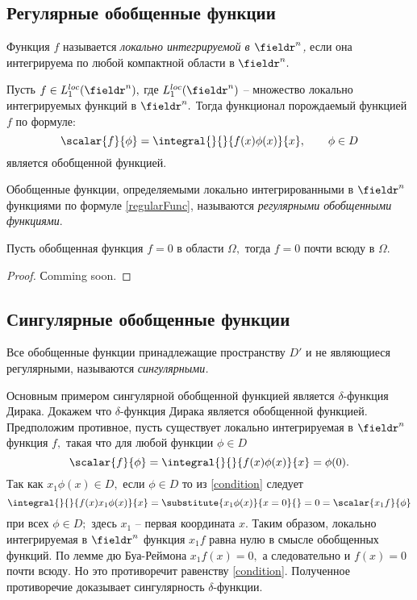 \subsection{Регулярные обобщенные функции}
Функция $f$ называется \emph{локально интегрируемой в $\fieldr^n$,} если она интегрируема по любой компактной области в $\fieldr^n.$

Пусть $f \in L_1^{loc}(\fieldr^n),$ где $L_1^{loc}(\fieldr^n)$ -- множество локально интегрируемых функций в $\fieldr^n.$ Тогда функционал порождаемый функцией $f$ по формуле:
\begin{equation}
\scalar{f}{\phi} = \integral{}{}{f(x)\phi(x)}{x}, \qquad \phi \in D
\label{regularFunc}
\end{equation}
является обобщенной функцией.
 
Обобщенные функции, определяемыми локально интегрированными в $\fieldr^n$ функциями по формуле \eqref{regularFunc}, называются \emph{регулярными обобщенными функциями}.
\begin{lemma}
 Пусть обобщенная функция $f = 0$ в области $\Omega,$ тогда $f = 0$ почти всюду в $\Omega.$ 
\end{lemma}
\begin{proof}
   Сomming soon.
\end{proof}

\subsection{Сингулярные обобщенные функции}
Все обобщенные функции принадлежащие пространству $D'$ и не являющиеся регулярными, называются \emph{сингулярными.}

Основным примером сингулярной обобщенной функцией является $\delta$-функция Дирака.
Докажем что $\delta$-функция Дирака является обобщенной функцией.
Предположим противное, пусть существует локально интегрируемая в $\fieldr^n$ функция $f,$ такая что для любой функции $\phi \in D$
\begin{equation}
\scalar{f}{\phi} = \integral{}{}{f(x)\phi(x)}{x} = \phi(0).
\label{condition}
\end{equation}
Так как $x_1\phi(x) \in D,$ если $\phi \in D$ то из \eqref{condition} следует
$$
\integral{}{}{f(x)x_1\phi(x)}{x} = \substitute{x_1\phi(x)}{x = 0}{} = 0 = \scalar{x_1f}{\phi}
$$
при всех $\phi \in D;$ здесь $x_1$ -- первая координата $x.$ Таким образом, локально интегрируемая в $\fieldr^n$ функция $x_1f$ равна нулю в смысле обобщенных функций. По лемме дю Буа-Реймона $x_1f(x) = 0,$ а следовательно и $f(x) = 0$ почти всюду. Но это противоречит равенству \eqref{condition}. Полученное противоречие доказывает сингулярность $\delta$-функции.

